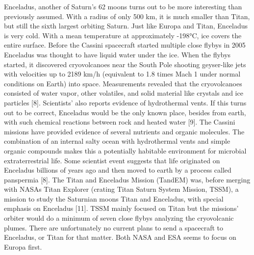 Enceladus, another of Saturn’s 62 moons turns out to be more interesting than previously assumed. With a radius of only 500 km, it is much smaller than Titan, but still the sixth largest orbiting Saturn. Just like Europa and Titan, Enceladus is very cold. With a mean temperature at approximately -198°C, ice covers the entire surface. Before the Cassini spacecraft started multiple close flybys in 2005 Enceladus was thought to have liquid water under the ice. When the flybys started, it discovered cryovolcanoes near the South Pole shooting geyser-like jets with velocities up to 2189 km/h (equivalent to 1.8 times Mach 1 under normal conditions on Earth) into space. Measurements revealed that the cryovolcanoes consisted of water vapor, other volatiles, and solid material like crystals and ice particles [8]. Scientists’ also reports evidence of hydrothermal vents. If this turns out to be correct, Enceladus would be the only known place, besides from earth, with such chemical reactions between rock and heated water [9].
The Cassini missions have provided evidence of several nutrients and organic molecules. The combination of an internal salty ocean with hydrothermal vents and simple organic compounds makes this a potentially habitable environment for microbial extraterrestrial life. Some scientist event suggests that life originated on Enceladus billions of years ago and then moved to earth by a process called panspermia [8].
The Titan and Enceladus Mission (TandEM) was, before merging with NASAs Titan Explorer (crating Titan Saturn System Mission, TSSM), a mission to study the Saturnian moons Titan and Enceladus, with special emphasis on Enceladus [11].
TSSM mainly focused on Titan but the missions’ orbiter would do a minimum of seven close flybys analyzing the cryovolcanic plumes.
There are unfortunately no current plans to send a spacecraft to Enceladus, or Titan for that matter. Both NASA and ESA seems to focus on Europa first.

